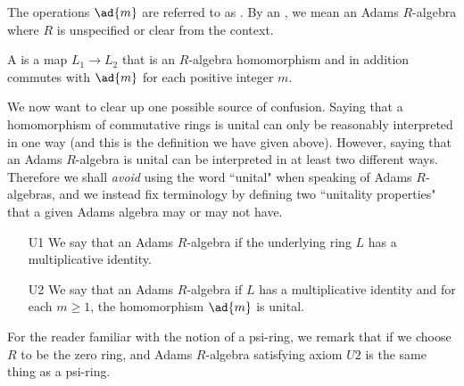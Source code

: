 \documentclass[a4paper]{article}
\begin{document}
The operations $\ad{m}$ are referred to as . By an , we mean an Adams $R$-algebra where $R$ is unspecified or clear from the context.

\begin{definition}
A  is a map $L_1 \to L_2$ that is an $R$-algebra homomorphism and in addition commutes with $\ad{m}$ for each positive integer $m$.
\end{definition}

We now want to clear up one possible source of confusion. Saying that a homomorphism of commutative rings is unital can only be reasonably interpreted in one way (and this is the definition we have given above). However, saying that an Adams $R$-algebra is unital can be interpreted in at least two different ways. Therefore we shall \emph{avoid} using the word ``unital" when speaking of Adams $R$-algebras, and we instead fix terminology by defining two ``unitality properties" that a given Adams algebra may or may not have.

\begin{itemize}
\item[U1] We say that an Adams $R$-algebra  if the underlying ring $L$ has a multiplicative identity.
\item[U2] We say that an Adams $R$-algebra  if $L$ has a multiplicative identity and for each $m \geq 1$, the homomorphism $\ad{m}$ is unital.



\end{itemize}
\begin{remark}
For the reader familiar with the notion of a psi-ring, we remark that if we choose $R$ to be the zero ring, and Adams $R$-algebra satisfying axiom $U2$ is the same thing as a psi-ring.
\end{remark}
\end{document}
